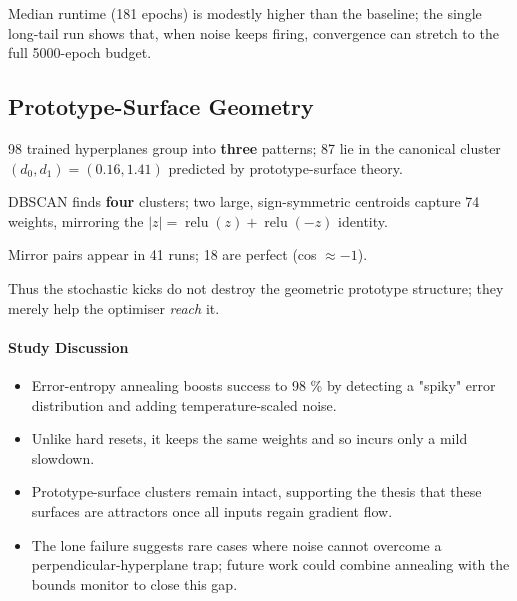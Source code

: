 Median runtime (181 epochs) is modestly higher than the baseline; the
single long-tail run shows that, when noise keeps firing, convergence
can stretch to the full 5000-epoch budget.

\subsection*{Prototype-Surface Geometry}

\begin{description}[leftmargin=2em]
  \item[Distance clusters]
        98 trained hyperplanes group into \textbf{three} patterns;  
        87 lie in the canonical cluster
        \((d_{0},d_{1})\!=\!(0.16,1.41)\) predicted by prototype-surface
        theory.%
  \item[Weight clusters]
        DBSCAN finds \textbf{four} clusters; two large, sign-symmetric
        centroids capture 74 weights, mirroring the
        $|z|=\operatorname{relu}(z)+\operatorname{relu}(-z)$ identity.%
  \item[Mirror symmetry]
        Mirror pairs appear in 41 runs; 18 are perfect (cos $\approx -1$).%
\end{description}

Thus the stochastic kicks do not destroy the geometric prototype
structure; they merely help the optimiser \emph{reach} it.

\paragraph{Study Discussion}
\begin{itemize}
  \item Error-entropy annealing boosts success to 98 \% by detecting a
        "spiky" error distribution and adding temperature-scaled noise.
  \item Unlike hard resets, it keeps the same weights and so incurs only
        a mild slowdown.
  \item Prototype-surface clusters remain intact, supporting the thesis
        that these surfaces are attractors once all inputs regain
        gradient flow.
  \item The lone failure suggests rare cases where noise cannot overcome
        a perpendicular-hyperplane trap; future work could combine
        annealing with the bounds monitor to close this gap.
\end{itemize}

\hrulefill
